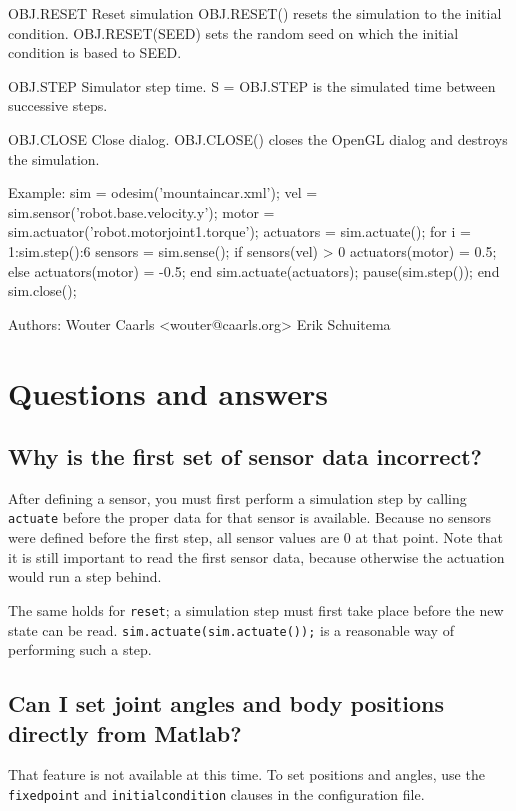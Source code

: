 \documentclass{article}
\newcommand{\txt}[1]{\texttt{#1}}
\newenvironment{code}{\alltt\small}{\endalltt}
\begin{document}
\begin{code}
       OBJ.RESET Reset simulation
          OBJ.RESET() resets the simulation to the initial condition.
          OBJ.RESET(SEED) sets the random seed on which the initial
          condition is based to SEED.
 
       OBJ.STEP Simulator step time.
          S = OBJ.STEP is the simulated time between successive steps.
 
       OBJ.CLOSE Close dialog.
          OBJ.CLOSE() closes the OpenGL dialog and destroys the simulation.
 
    Example:
       sim = odesim('mountaincar.xml');
       vel = sim.sensor('robot.base.velocity.y');
       motor = sim.actuator('robot.motorjoint1.torque');
       actuators = sim.actuate();
       for i = 1:sim.step():6
         sensors = sim.sense();
         if sensors(vel) > 0
           actuators(motor) = 0.5;
         else
           actuators(motor) = -0.5;
         end
         sim.actuate(actuators);
         pause(sim.step());
       end
       sim.close();
 
    Authors:
       Wouter Caarls <wouter@caarls.org>
       Erik Schuitema
\end{code}

\section{Questions and answers}
\subsection*{Why is the first set of sensor data incorrect?}
After defining a sensor, you must first perform a simulation step by calling \txt{actuate} before the proper data for that sensor is available. Because no sensors were defined before the first step, all sensor values are 0 at that point. Note that it is still important to read the first sensor data, because otherwise the actuation would run a step behind.

The same holds for \txt{reset}; a simulation step must first take place before the new state can be read. \txt{sim.actuate(sim.actuate());} is a reasonable way of performing such a step. 

\subsection*{Can I set joint angles and body positions directly from Matlab?}
That feature is not available at this time. To set positions and angles, use the \txt{fixedpoint} and \txt{initialcondition} clauses in the configuration file.
\end{document}
